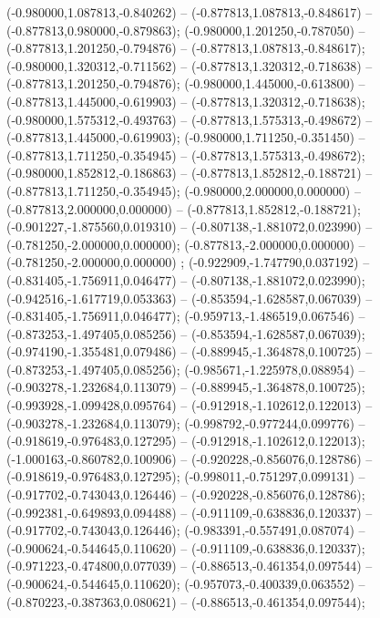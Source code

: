 (-0.980000,1.087813,-0.840262) -- (-0.877813,1.087813,-0.848617) -- (-0.877813,0.980000,-0.879863);
 (-0.980000,1.201250,-0.787050) -- (-0.877813,1.201250,-0.794876) -- (-0.877813,1.087813,-0.848617);
 (-0.980000,1.320312,-0.711562) -- (-0.877813,1.320312,-0.718638) -- (-0.877813,1.201250,-0.794876);
 (-0.980000,1.445000,-0.613800) -- (-0.877813,1.445000,-0.619903) -- (-0.877813,1.320312,-0.718638);
 (-0.980000,1.575312,-0.493763) -- (-0.877813,1.575313,-0.498672) -- (-0.877813,1.445000,-0.619903);
 (-0.980000,1.711250,-0.351450) -- (-0.877813,1.711250,-0.354945) -- (-0.877813,1.575313,-0.498672);
 (-0.980000,1.852812,-0.186863) -- (-0.877813,1.852812,-0.188721) -- (-0.877813,1.711250,-0.354945);
 (-0.980000,2.000000,0.000000) -- (-0.877813,2.000000,0.000000) -- (-0.877813,1.852812,-0.188721);
 (-0.901227,-1.875560,0.019310) -- (-0.807138,-1.881072,0.023990) -- (-0.781250,-2.000000,0.000000);
 (-0.877813,-2.000000,0.000000) -- (-0.781250,-2.000000,0.000000) ;
 (-0.922909,-1.747790,0.037192) -- (-0.831405,-1.756911,0.046477) -- (-0.807138,-1.881072,0.023990);
 (-0.942516,-1.617719,0.053363) -- (-0.853594,-1.628587,0.067039) -- (-0.831405,-1.756911,0.046477);
 (-0.959713,-1.486519,0.067546) -- (-0.873253,-1.497405,0.085256) -- (-0.853594,-1.628587,0.067039);
 (-0.974190,-1.355481,0.079486) -- (-0.889945,-1.364878,0.100725) -- (-0.873253,-1.497405,0.085256);
 (-0.985671,-1.225978,0.088954) -- (-0.903278,-1.232684,0.113079) -- (-0.889945,-1.364878,0.100725);
 (-0.993928,-1.099428,0.095764) -- (-0.912918,-1.102612,0.122013) -- (-0.903278,-1.232684,0.113079);
 (-0.998792,-0.977244,0.099776) -- (-0.918619,-0.976483,0.127295) -- (-0.912918,-1.102612,0.122013);
 (-1.000163,-0.860782,0.100906) -- (-0.920228,-0.856076,0.128786) -- (-0.918619,-0.976483,0.127295);
 (-0.998011,-0.751297,0.099131) -- (-0.917702,-0.743043,0.126446) -- (-0.920228,-0.856076,0.128786);
 (-0.992381,-0.649893,0.094488) -- (-0.911109,-0.638836,0.120337) -- (-0.917702,-0.743043,0.126446);
 (-0.983391,-0.557491,0.087074) -- (-0.900624,-0.544645,0.110620) -- (-0.911109,-0.638836,0.120337);
 (-0.971223,-0.474800,0.077039) -- (-0.886513,-0.461354,0.097544) -- (-0.900624,-0.544645,0.110620);
 (-0.957073,-0.400339,0.063552) -- (-0.870223,-0.387363,0.080621) -- (-0.886513,-0.461354,0.097544);
